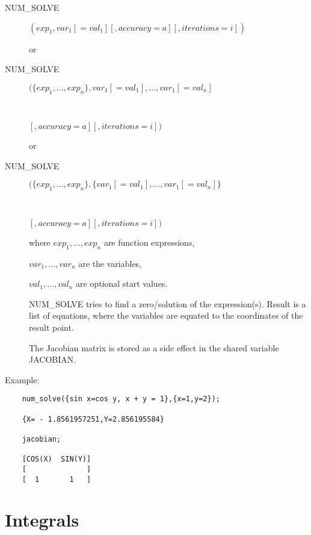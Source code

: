 \begin{description}
\item[NUM\_SOLVE]  $(exp_1, var_1[=val_1][,accuracy=a][,iterations=i])$

or

\item[NUM\_SOLVE]  $(\{exp_1,\ldots,exp_n\},
   var_1[=val_1],\ldots,var_1[=val_n]$
\item[\ \ \ \ \ \ \ \ ]$[,accuracy=a][,iterations=i])$

or

\item[NUM\_SOLVE]  $(\{exp_1,\ldots,exp_n\},
   \{var_1[=val_1],\ldots,var_1[=val_n]\}$
\item[\ \ \ \ \ \ \ \ ]$[,accuracy=a][,iterations=i])$

where $exp_1, \ldots,exp_n$ are function expressions,

      $var_1, \ldots, var_n$ are the variables,

      $val_1, \ldots, val_n$ are optional start values.

NUM\_SOLVE tries to find a zero/solution of the expression(s).
Result is a list of equations, where the variables are
equated to the coordinates of the result point.

The Jacobian matrix is stored as a side effect in the shared
variable JACOBIAN.

\end{description}

Example:

\begin{verbatim}
    num_solve({sin x=cos y, x + y = 1},{x=1,y=2});

    {X= - 1.8561957251,Y=2.856195584}

    jacobian;

    [COS(X)  SIN(Y)]
    [              ]
    [  1       1   ]
\end{verbatim}

\section{Integrals}

